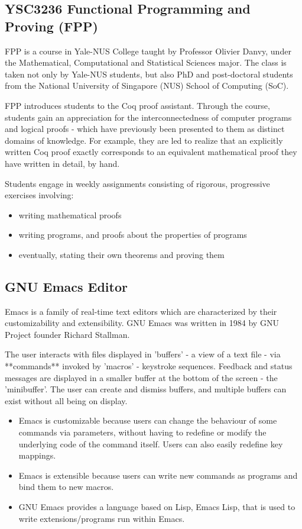 \subsection{YSC3236 Functional Programming and Proving (FPP)}
FPP is a course in Yale-NUS College taught by Professor Olivier Danvy, under the Mathematical, Computational and Statistical Sciences major. The class is taken not only by Yale-NUS students, but also PhD and post-doctoral students from the National University of Singapore (NUS) School of Computing (SoC). 

FPP introduces students to the Coq proof assistant. Through the course, students gain an appreciation for the interconnectedness of computer programs and logical proofs - which have previously been presented to them as distinct domains of knowledge. For example, they are led to realize that an explicitly written Coq proof exactly corresponds to an equivalent mathematical proof they have written in detail, by hand.
  
Students engage in weekly assignments consisting of rigorous, progressive exercises involving:
\begin{itemize}    
    \item writing mathematical proofs
    \item  writing programs, and proofs about the properties of programs
    \item eventually, stating their own theorems and proving them
\end{itemize}

\subsection{GNU Emacs Editor}   

Emacs is a family of real-time text editors which are characterized by their customizability and extensibility. GNU Emacs was written in 1984 by GNU Project founder Richard Stallman. 

The user interacts with files displayed in 'buffers' - a view of a text file - via **commands** invoked by 'macros' - keystroke sequences. Feedback and status messages are displayed in a smaller buffer at the bottom of the screen - the 'minibuffer'. The user can create and dismiss buffers, and multiple buffers can exist without all being on display.  

\begin{itemize}
    \item Emacs is customizable because users can change the behaviour of some commands via parameters, without having to redefine or modify the underlying code of the command itself. Users can also easily redefine key mappings.
    \item Emacs is extensible because users can write new commands as programs and bind them to new macros. 
    \item GNU Emacs provides a language based on Lisp, Emacs Lisp, that is used to write extensions/programs run within Emacs. 
\end{itemize}

